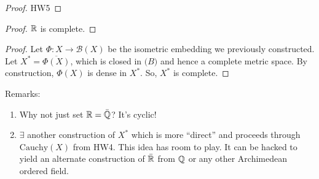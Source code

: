 \documentclass{report}
\begin{document}
\begin{proof}
    HW5
\end{proof}

\begin{proof}
    $\RR$ is complete. 
\end{proof}

\begin{proof}
    Let $\Phi: X \to \mathcal B(X)$ be the isometric embedding we previously constructed. Let $X^* = \overline{\Phi(X)}$, which is closed in $\mathcal (B)$ and hence a complete metric space. By construction, $\Phi(X)$ is dense in $X^*$. So, $X^*$ is complete.
\end{proof}
\noindent Remarks:
\begin{enumerate}
    \item Why not just set $\RR = \bar \QQ$? It's cyclic!
    \item $\exists$ another construction of $X^*$ which is more ``direct'' and proceeds through $\text{Cauchy}(X)$ from HW4. This idea has room to play. It can be hacked to yield an alternate construction of $\bar \RR$ from $\QQ$ or any other Archimedean ordered field. 
\end{enumerate}
\end{document}
